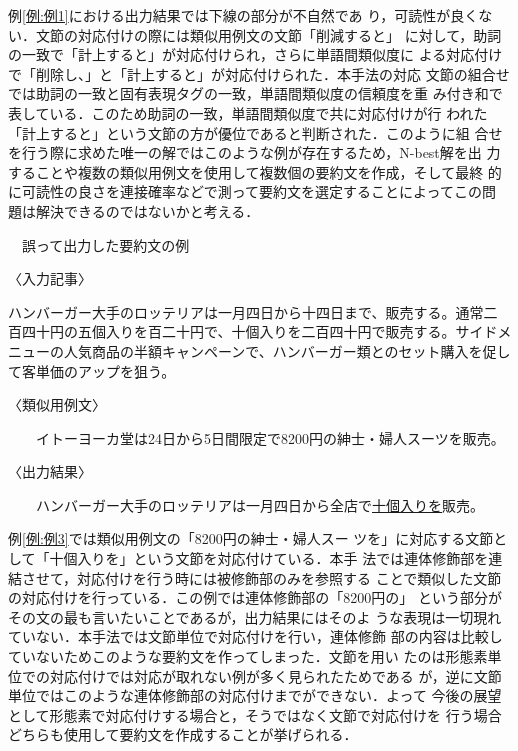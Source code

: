 \documentclass[japanese]{jnlp_1.4}
\newcounter{exp}
\def\exp#1{}
\begin{document}
例\ref{例:例1}における出力結果では下線の部分が不自然であ
り，可読性が良くない．文節の対応付けの際には類似用例文の文節「削減すると」
に対して，助詞の一致で「計上すると」が対応付けられ，さらに単語間類似度に
よる対応付けで「削除し、」と「計上すると」が対応付けられた．本手法の対応
文節の組合せでは助詞の一致と固有表現タグの一致，単語間類似度の信頼度を重
み付き和で表している．このため助詞の一致，単語間類似度で共に対応付けが行
われた「計上すると」という文節の方が優位であると判断された．このように組
合せを行う際に求めた唯一の解ではこのような例が存在するため，N-best解を出
力することや複数の類似用例文を使用して複数個の要約文を作成，そして最終
的に可読性の良さを連接確率などで測って要約文を選定することによってこの問
題は解決できるのではないかと考える．



\begin{screen}
\exp{例:例3}　誤って出力した要約文の例

〈入力記事〉

{\setlength{\leftskip}{2zw}
ハンバーガー大手のロッテリアは一月四日から十四日まで、\setnami{}\setniju{}販売する。通常二
百四十円の五個入りを百二十円で、十個入りを二百四十円で販売する。サイドメ
ニューの人気商品の半額キャンペーンで、ハンバーガー類とのセット購入を促し
て客単価のアップを狙う。
\par}

〈類似用例文〉

　　イトーヨーカ堂は24日から5日間限定で8200円の紳士・婦人スーツを販売。

〈出力結果〉

　　ハンバーガー大手のロッテリアは一月四日から全店で\ul{十個入りを}販売。
\end{screen}

例\ref{例:例3}では類似用例文の「8200円の紳士・婦人スー
ツを」に対応する文節として「十個入りを」という文節を対応付けている．本手
法では連体修飾部を連結させて，対応付けを行う時には被修飾部のみを参照する
ことで類似した文節の対応付けを行っている．この例では連体修飾部の「8200円の」
という部分がその文の最も言いたいことであるが，出力結果にはそのよ
うな表現は一切現れていない．本手法では文節単位で対応付けを行い，連体修飾
部の内容は比較していないためこのような要約文を作ってしまった．文節を用い
たのは形態素単位での対応付けでは対応が取れない例が多く見られたためである
が，逆に文節単位ではこのような連体修飾部の対応付けまでができない．よって
今後の展望として形態素で対応付けする場合と，そうではなく文節で対応付けを
行う場合どちらも使用して要約文を作成することが挙げられる．
\end{document}
